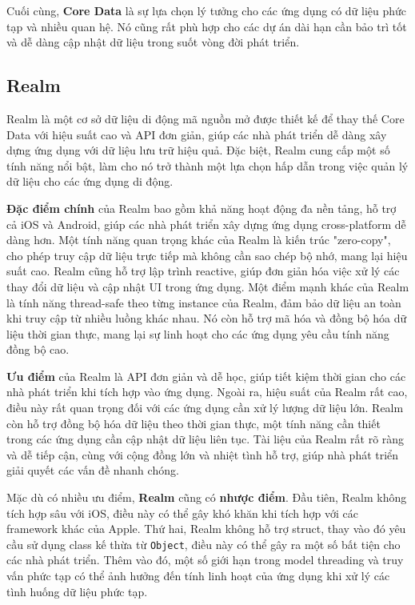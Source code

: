 \vspace{0.5em}

Cuối cùng, \textbf{Core Data} là sự lựa chọn lý tưởng cho các ứng dụng có dữ liệu phức tạp và nhiều quan hệ. Nó cũng rất phù hợp cho các dự án dài hạn cần bảo trì tốt và dễ dàng cập nhật dữ liệu trong suốt vòng đời phát triển.

\subsection{Realm}
Realm là một cơ sở dữ liệu di động mã nguồn mở được thiết kế để thay thế Core Data với hiệu suất cao và API đơn giản, giúp các nhà phát triển dễ dàng xây dựng ứng dụng với dữ liệu lưu trữ hiệu quả. Đặc biệt, Realm cung cấp một số tính năng nổi bật, làm cho nó trở thành một lựa chọn hấp dẫn trong việc quản lý dữ liệu cho các ứng dụng di động.

\vspace{0.5em}

\textbf{Đặc điểm chính} của Realm bao gồm khả năng hoạt động đa nền tảng, hỗ trợ cả iOS và Android, giúp các nhà phát triển xây dựng ứng dụng cross-platform dễ dàng hơn. Một tính năng quan trọng khác của Realm là kiến trúc "zero-copy", cho phép truy cập dữ liệu trực tiếp mà không cần sao chép bộ nhớ, mang lại hiệu suất cao. Realm cũng hỗ trợ lập trình reactive, giúp đơn giản hóa việc xử lý các thay đổi dữ liệu và cập nhật UI trong ứng dụng. Một điểm mạnh khác của Realm là tính năng thread-safe theo từng instance của Realm, đảm bảo dữ liệu an toàn khi truy cập từ nhiều luồng khác nhau. Nó còn hỗ trợ mã hóa và đồng bộ hóa dữ liệu thời gian thực, mang lại sự linh hoạt cho các ứng dụng yêu cầu tính năng đồng bộ cao.

\vspace{0.5em}

\textbf{Ưu điểm} của Realm là API đơn giản và dễ học, giúp tiết kiệm thời gian cho các nhà phát triển khi tích hợp vào ứng dụng. Ngoài ra, hiệu suất của Realm rất cao, điều này rất quan trọng đối với các ứng dụng cần xử lý lượng dữ liệu lớn. Realm còn hỗ trợ đồng bộ hóa dữ liệu theo thời gian thực, một tính năng cần thiết trong các ứng dụng cần cập nhật dữ liệu liên tục. Tài liệu của Realm rất rõ ràng và dễ tiếp cận, cùng với cộng đồng lớn và nhiệt tình hỗ trợ, giúp nhà phát triển giải quyết các vấn đề nhanh chóng.

\vspace{0.5em}

Mặc dù có nhiều ưu điểm, \textbf{Realm} cũng có \textbf{nhược điểm}. Đầu tiên, Realm không tích hợp sâu với iOS, điều này có thể gây khó khăn khi tích hợp với các framework khác của Apple. Thứ hai, Realm không hỗ trợ struct, thay vào đó yêu cầu sử dụng class kế thừa từ \texttt{Object}, điều này có thể gây ra một số bất tiện cho các nhà phát triển. Thêm vào đó, một số giới hạn trong model threading và truy vấn phức tạp có thể ảnh hưởng đến tính linh hoạt của ứng dụng khi xử lý các tình huống dữ liệu phức tạp.

